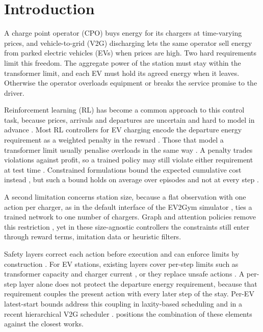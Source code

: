 \section{Introduction}\label{sec:intro}

A charge point operator (CPO) buys energy for its chargers at time-varying prices, and vehicle-to-grid (V2G) discharging lets the same operator sell energy from parked electric vehicles (EVs) when prices are high.
Two hard requirements limit this freedom.
The aggregate power of the station must stay within the transformer limit, and each EV must hold its agreed energy when it leaves.
Otherwise the operator overloads equipment or breaks the service promise to the driver.

Reinforcement learning (RL) has become a common approach to this control task, because prices, arrivals and departures are uncertain and hard to model in advance \cite{qiu2023reinforcement,michailidis2025reinforcement}.
Most RL controllers for EV charging encode the departure energy requirement as a weighted penalty in the reward \cite{sadeghianpourhamami2020definition,ye2022learning,korkas2024distributed,orfanoudakis2025ev2gym}.
Those that model a transformer limit usually penalise overloads in the same way \cite{orfanoudakis2025ev2gym,orfanoudakis2026graph}.
A penalty trades violations against profit, so a trained policy may still violate either requirement at test time \cite{orfanoudakis2025ev2gym,tabas2022computationally}.
Constrained formulations bound the expected cumulative cost instead \cite{altman2021constrained}, but such a bound holds on average over episodes and not at every step \cite{gu2024review}.

A second limitation concerns station size, because a flat observation with one action per charger, as in the default interface of the EV2Gym simulator \cite{orfanoudakis2025ev2gym}, ties a trained network to one number of chargers.
Graph and attention policies remove this restriction \cite{orfanoudakis2025scalable,orfanoudakis2026graph,wang2026hetgps}, yet in these size-agnostic controllers the constraints still enter through reward terms, imitation data or heuristic filters.

Safety layers correct each action before execution and can enforce limits by construction \cite{dalal2018safe,chen2021enforcing,tabas2022computationally}.
For EV stations, existing layers cover per-step limits such as transformer capacity and charger current \cite{wan2025logicinformed}, or they replace unsafe actions \cite{guan2024rule,zhang2025dumes}.
A per-step layer alone does not protect the departure energy requirement, because that requirement couples the present action with every later step of the stay.
Per-EV latest-start bounds address this coupling in laxity-based scheduling \cite{chen2022smoothed} and in a recent hierarchical V2G scheduler \cite{yan2026hierarchical}.
 positions the combination of these elements against the closest works.

